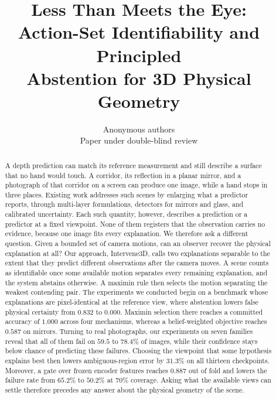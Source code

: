 \documentclass{article} %
\title{Less Than Meets the Eye: \\Action-Set Identifiability and Principled\\Abstention for 3D Physical Geometry}
\author{Anonymous authors \\ Paper under double-blind review}
\theoremstyle{defstyle}
\theoremstyle{plain}
\begin{document}
\maketitle
\suppressfloats[t]

\begin{abstract}
A depth prediction can match its reference measurement and still describe a surface that no
hand would touch. A corridor, its reflection in a planar mirror, and a photograph of that
corridor on a screen can produce one image, while a hand stops in three places. Existing work
addresses such scenes by enlarging what a predictor reports, through multi-layer formulations,
detectors for mirrors and glass, and calibrated uncertainty. Each such quantity, however,
describes a prediction or a predictor at a fixed viewpoint. None of them registers that the
observation carries no evidence, because one image fits every explanation. We therefore ask a
different question. Given a bounded set of camera motions, can an observer recover the physical
explanation at all? Our approach, Intervene3D, calls two explanations separable to the extent
that they predict different observations after the camera moves. A scene counts as identifiable
once some available motion separates every remaining explanation, and the system abstains
otherwise. A maximin rule then selects the motion separating the weakest contending pair. The
experiments we conducted begin on a benchmark whose explanations are pixel-identical at the
reference view, where abstention lowers false physical certainty from $0.832$ to $0.000$.
Maximin selection there reaches a committed accuracy of $1.000$ across four mechanisms, whereas
a belief-weighted objective reaches $0.587$ on mirrors. Turning to real photographs, our
experiments on seven families reveal that all of them fail on $59.5$ to $78.4\%$ of images,
while their confidence stays below chance of predicting these failures. Choosing the viewpoint
that some hypothesis explains best then lowers ambiguous-region error by $31.3\%$ on all
thirteen checkpoints. Moreover, a gate over frozen encoder features reaches $0.887$ out of fold
and lowers the failure rate from $65.2\%$ to $50.2\%$ at $70\%$ coverage. Asking what the
available views can settle therefore precedes any answer about the physical geometry of the
scene.
\end{abstract}

\end{document}

